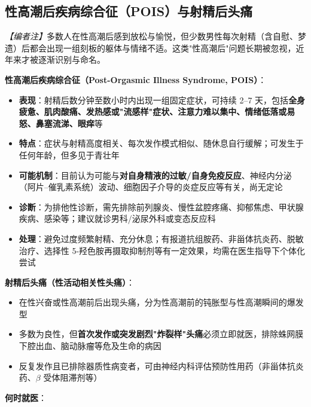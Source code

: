\subsection{性高潮后疾病综合征（POIS）与射精后头痛}
\label{subsec:pois}

\noindent\textit{【编者注】}多数人在性高潮后感到放松与愉悦，但少数男性每次射精（含自慰、梦遗）后都会出现一组刻板的躯体与情绪不适。这类"性高潮后"问题长期被忽视，近年来才被逐渐识别与命名。

\vspace{0.5em}
\noindent\textbf{性高潮后疾病综合征（Post-Orgasmic Illness Syndrome, POIS）}：

\begin{itemize}[leftmargin=2cm]
	\item \textbf{表现}：射精后数分钟至数小时内出现一组固定症状，可持续 2--7 天，包括\textbf{全身疲惫、肌肉酸痛、发热感或"流感样"症状、注意力难以集中、情绪低落或易怒、鼻塞流涕、眼痒}等
	\item \textbf{特点}：症状与射精高度相关、每次发作模式相似、随休息自行缓解；可发生于任何年龄，但多见于青壮年
	\item \textbf{可能机制}：目前认为可能与\textbf{对自身精液的过敏/自身免疫反应}、神经内分泌（阿片--催乳素系统）波动、细胞因子介导的炎症反应等有关，尚无定论
	\item \textbf{诊断}：为排他性诊断，需先排除前列腺炎、慢性盆腔疼痛、抑郁焦虑、甲状腺疾病、感染等；建议就诊男科/泌尿外科或变态反应科
	\item \textbf{处理}：避免过度频繁射精、充分休息；有报道抗组胺药、非甾体抗炎药、脱敏治疗、选择性 5-羟色胺再摄取抑制剂等有一定效果，均需在医生指导下个体化尝试
\end{itemize}

\vspace{0.5em}
\noindent\textbf{射精后头痛（性活动相关性头痛）}：

\begin{itemize}[leftmargin=2cm]
	\item 在性兴奋或性高潮前后出现头痛，分为性高潮前的钝胀型与性高潮瞬间的爆发型
	\item 多数为良性，但\textbf{首次发作或突发剧烈"炸裂样"头痛}必须立即就医，排除蛛网膜下腔出血、脑动脉瘤等危及生命的病因
	\item 反复发作且已排除器质性病变者，可由神经内科评估预防性用药（非甾体抗炎药、$\beta$ 受体阻滞剂等）
\end{itemize}

\vspace{0.5em}
\noindent\textbf{何时就医}：

